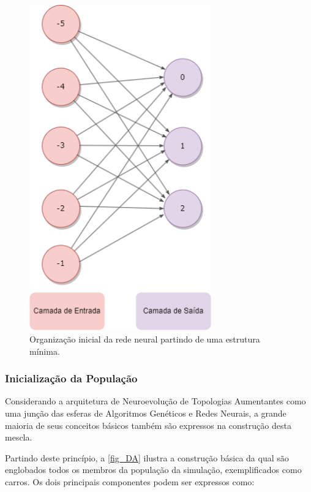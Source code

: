 \begin{figure}[htb]
        \centering
        \caption{\label{fig_CC}Organização inicial da rede neural partindo de uma estrutura mínima.}
        \includegraphics[width=0.7\textwidth]{images/CC.png}
\end{figure}

\subsubsection{Inicialização da População}
Considerando a arquitetura de Neuroevolução de Topologias Aumentantes como uma junção das esferas de Algoritmos Genéticos e Redes Neurais, a grande maioria de seus conceitos básicos também são expressos na construção desta mescla.

Partindo deste princípio, a \autoref{fig_DA} ilustra a construção básica da qual são englobados todos os membros da população da simulação, exemplificados como carros. Os dois principais componentes podem ser expressos como:

